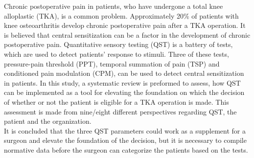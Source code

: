 Chronic postoperative pain in patients, who have undergone a total knee alloplastic (TKA), is a common problem. Approximately 20\% of patients with knee osteoarthritis develop chronic postoperative pain after a TKA operation. It is believed that central sensitization can be a factor in the development of chronic postoperative pain. Quantitative sensory testing (QST) is a battery of tests, which are used to detect patients’ response to stimuli. Three of these tests, pressure-pain threshold (PPT), temporal summation of pain (TSP) and conditioned pain modulation (CPM), can be used to detect central sensitization in patients. In this study, a systematic review is preformed to assess, how QST can be implemented as a tool for elevating the foundation on which the decision of whether or not the patient is eligible for a TKA operation is made. This assessment is made from nine/eight different perspectives regarding QST, the patient and the organization. \\
It is concluded that the three QST parameters could work as a supplement for a surgeon and elevate the foundation of the decision, but it is necessary to compile normative data before the surgeon can categorize the patients based on the tests.        

